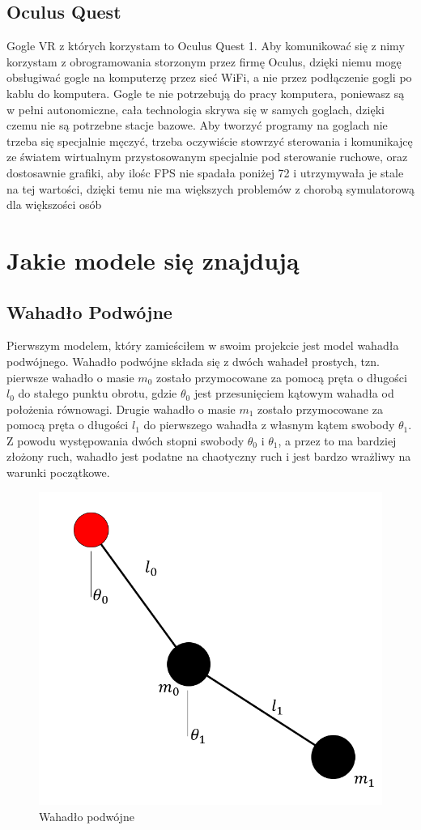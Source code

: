 \documentclass[a4paper,12pt,reqno]{article}
\begin{document}
\subsection{Oculus Quest}

{\color{red}
 Gogle VR z których korzystam to Oculus Quest 1. Aby komunikować się z nimy korzystam z obrogramowania storzonym przez firmę Oculus, dzięki niemu mogę obsługiwać gogle na komputerzę przez sieć WiFi, a nie przez podłączenie gogli po kablu do komputera. Gogle te nie potrzebują do pracy komputera, poniewasz są w pełni autonomiczne, cała technologia skrywa się w samych goglach, dzięki czemu nie są potrzebne stacje bazowe. Aby tworzyć programy na goglach nie trzeba się specjalnie męczyć, trzeba oczywiście stowrzyć sterowania i komunikajcę ze światem wirtualnym przystosowanym specjalnie pod sterowanie ruchowe, oraz dostosawnie grafiki, aby ilośc FPS nie spadała poniżej 72 i utrzymywała je stale na tej wartości, dzięki temu nie ma większych problemów z chorobą symulatorową dla większości osób
}

\section{Jakie modele się znajdują}

\subsection{Wahadło Podwójne}

Pierwszym modelem, który zamieściłem w swoim projekcie jest model wahadła podwójnego. Wahadło podwójne składa się z dwóch wahadeł prostych, tzn. pierwsze wahadło o masie $m_0$ zostało przymocowane za pomocą pręta o długości $l_0$ do stałego punktu obrotu, gdzie $\theta_0$ jest przesunięciem kątowym wahadła od położenia równowagi. Drugie wahadło o masie $m_1$ zostało przymocowane za pomocą pręta o długości $l_1$ do pierwszego wahadła z własnym kątem swobody $\theta_1$. Z powodu występowania dwóch stopni swobody $\theta_0$ i $\theta_1$, a przez to ma bardziej złożony ruch, wahadło jest podatne na chaotyczny ruch i jest bardzo wrażliwy na warunki początkowe\cite{double_pendulum_book}.

\begin{figure}[H]%
\centering
\includegraphics[width=0.5\columnwidth]{graphics/pendulum/DoublePendulum.png}
\caption{Wahadło podwójne
\label{BPExample}}%
%
\qquad
\end{figure}  
\end{document}
